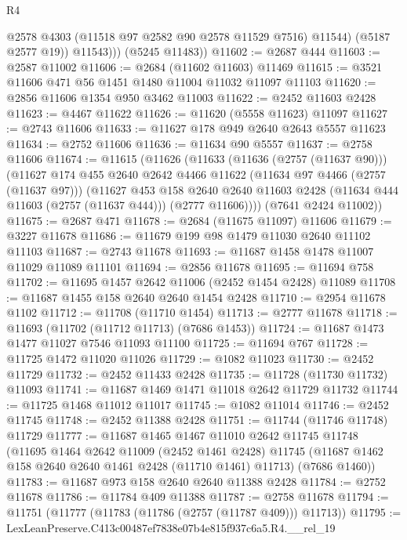 \begin{lexlean}{R4}
\begin{coremodule}
                @2578
                @4303
                (@11518 @97 @2582 @90 @2578 @11529 @7516)
                @11544)
              (@5187 @2577 @19))
            @11543)))
      (@5245 @11483))
@11602 := @2687 @444
@11603 := @2587 @11002
@11606 := @2684 (@11602 @11603) @11469
@11615 := @3521 @11606 @471 @56 @1451 @1480 @11004 @11032 @11097 @11103
@11620 := @2856 @11606 @1354 @950 @3462 @11003
@11622 := @2452 @11603 @2428
@11623 := @4467 @11622
@11626 := @11620 (@5558 @11623) @11097
@11627 := @2743 @11606
@11633 := @11627 @178 @949 @2640 @2643 @5557 @11623
@11634 := @2752 @11606
@11636 := @11634 @90 @5557
@11637 := @2758 @11606
@11674 := @11615
    (@11626
      (@11633
        (@11636 (@2757 (@11637 @90)))
        (@11627
          @174
          @455
          @2640
          @2642
          @4466
          @11622
          (@11634 @97 @4466 (@2757 (@11637 @97)))
          (@11627
            @453
            @158
            @2640
            @2640
            @11603
            @2428
            (@11634 @444 @11603 (@2757 (@11637 @444)))
            (@2777 @11606))))
      (@7641 @2424 @11002))
@11675 := @2687 @471
@11678 := @2684 (@11675 @11097) @11606
@11679 := @3227 @11678
@11686 := @11679 @199 @98 @1479 @11030 @2640 @11102 @11103
@11687 := @2743 @11678
@11693 := @11687 @1458 @1478 @11007 @11029 @11089 @11101
@11694 := @2856 @11678
@11695 := @11694 @758
@11702 := @11695 @1457 @2642 @11006 (@2452 @1454 @2428) @11089
@11708 := @11687 @1455 @158 @2640 @2640 @1454 @2428
@11710 := @2954 @11678 @1102
@11712 := @11708 (@11710 @1454)
@11713 := @2777 @11678
@11718 := @11693 (@11702 (@11712 @11713) (@7686 @1453))
@11724 := @11687 @1473 @1477 @11027 @7546 @11093 @11100
@11725 := @11694 @767
@11728 := @11725 @1472 @11020 @11026
@11729 := @1082 @11023
@11730 := @2452 @11729
@11732 := @2452 @11433 @2428
@11735 := @11728 (@11730 @11732) @11093
@11741 := @11687 @1469 @1471 @11018 @2642 @11729 @11732
@11744 := @11725 @1468 @11012 @11017
@11745 := @1082 @11014
@11746 := @2452 @11745
@11748 := @2452 @11388 @2428
@11751 := @11744 (@11746 @11748) @11729
@11777 := @11687
    @1465
    @1467
    @11010
    @2642
    @11745
    @11748
    (@11695
      @1464
      @2642
      @11009
      (@2452 @1461 @2428)
      @11745
      (@11687 @1462 @158 @2640 @2640 @1461 @2428 (@11710 @1461) @11713)
      (@7686 @1460))
@11783 := @11687 @973 @158 @2640 @2640 @11388 @2428
@11784 := @2752 @11678
@11786 := @11784 @409 @11388
@11787 := @2758 @11678
@11794 := @11751 (@11777 (@11783 (@11786 (@2757 (@11787 @409))) @11713))
@11795 := LexLeanPreserve.C413c00487ef7838e07b4e815f937c6a5.R4.__rel_19

\end{coremodule}
\end{lexlean}
